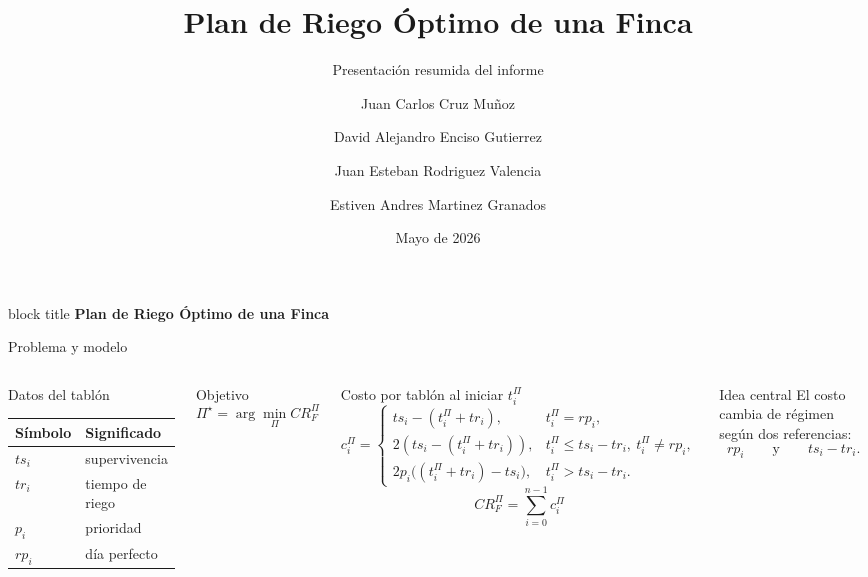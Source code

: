 \documentclass[aspectratio=169]{beamer}
\title[Plan de riego]{Plan de Riego \'Optimo de una Finca}
\subtitle{Presentaci\'on resumida del informe}
\author[Equipo ADA II]{Juan Carlos Cruz Mu\~noz \and David Alejandro Enciso Gutierrez \and Juan Esteban Rodriguez Valencia \and Estiven Andres Martinez Granados}
\institute[Univalle]{Universidad del Valle \\ An\'alisis de Algoritmos II}
\date{Mayo de 2026}
\begin{document}
\begin{frame}
  \vspace{1.0cm}
  \begin{beamercolorbox}[wd=\textwidth,rounded=true,sep=0.6cm,center]{block title}
    {\color{white}\rmfamily\bfseries\Large Plan de Riego \'Optimo de una Finca}
  \end{beamercolorbox}

  \vspace{0.9cm}
  \begin{center}
    {\large \insertauthor\par}
    \vspace{0.8cm}
    {\normalsize \insertinstitute\par}
    \vspace{0.8cm}
    {\large \insertdate\par}
  \end{center}
\end{frame}

\begin{frame}{Problema y modelo}
  \begin{columns}[T,onlytextwidth]
    \small
    \begin{block}{Datos del tabl\'on}
      \begin{tabular}{@{}ll@{}}
        \toprule
        S\'imbolo & Significado \\
        \midrule
        \(ts_i\) & supervivencia \\
        \(tr_i\) & tiempo de riego \\
        \(p_i\) & prioridad \\
        \(rp_i\) & d\'ia perfecto \\
        \bottomrule
      \end{tabular}
    \end{block}

    \begin{alertblock}{Objetivo}
      \[
      \Pi^\star=\arg\min_{\Pi} CR_F^\Pi
      \]
    \end{alertblock}

    \scriptsize
    \begin{block}{Costo por tabl\'on al iniciar \(t_i^\Pi\)}
      \[
      c_i^\Pi=
      \begin{cases}
      ts_i-(t_i^\Pi+tr_i), & t_i^\Pi=rp_i,\\
      2\left(ts_i-(t_i^\Pi+tr_i)\right), &
      t_i^\Pi\le ts_i-tr_i,\ t_i^\Pi\neq rp_i,\\
      2p_i\big((t_i^\Pi+tr_i)-ts_i\big), &
      t_i^\Pi>ts_i-tr_i.
      \end{cases}
      \]
      \[
      CR_F^\Pi=\sum_{i=0}^{n-1} c_i^\Pi
      \]
    \end{block}

    \begin{block}{Idea central}
      El costo cambia de r\'egimen seg\'un dos referencias:
      \[
      rp_i
      \qquad\text{y}\qquad
      ts_i-tr_i.
      \]
    \end{block}
  \end{columns}
\end{frame}
\end{document}
